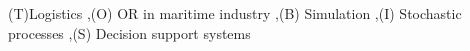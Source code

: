 \begin{keyword}
(T)Logistics \sep (O) OR in maritime industry \sep (B) Simulation \sep (I) Stochastic processes \sep (S) Decision support systems
\end{keyword}